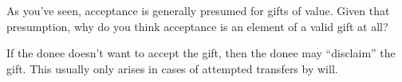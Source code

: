 As you've seen, acceptance is generally presumed for gifts of value.  Given that
presumption, why do you think acceptance is an element of a valid gift at all? 

If the donee doesn't want to accept the gift, then the donee may ``disclaim''
the gift.  This usually only arises in cases of attempted transfers by will. 

